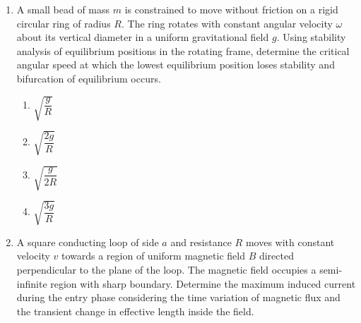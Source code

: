 \documentclass[12pt]{article}
\begin{document}
\begin{enumerate}
\item
A small bead of mass $m$ is constrained to move without friction on a rigid circular ring of radius $R$. The ring rotates with constant angular velocity $\omega$ about its vertical diameter in a uniform gravitational field $g$. Using stability analysis of equilibrium positions in the rotating frame, determine the critical angular speed at which the lowest equilibrium position loses stability and bifurcation of equilibrium occurs.


\begin{center}
\end{center}

\begin{enumerate}[label=\Alph*)]
\item $\sqrt{\dfrac{g}{R}}$
\item $\sqrt{\dfrac{2g}{R}}$
\item $\sqrt{\dfrac{g}{2R}}$
\item $\sqrt{\dfrac{3g}{R}}$
\end{enumerate}



\item
A square conducting loop of side $a$ and resistance $R$ moves with constant velocity $v$ towards a region of uniform magnetic field $B$ directed perpendicular to the plane of the loop. The magnetic field occupies a semi-infinite region with sharp boundary. Determine the maximum induced current during the entry phase considering the time variation of magnetic flux and the transient change in effective length inside the field.


\end{enumerate}
\end{document}
